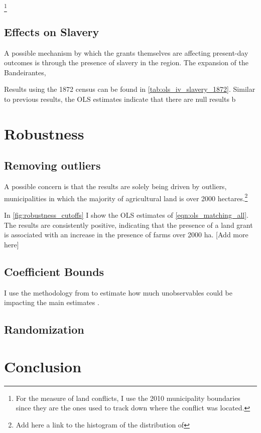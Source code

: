 \documentclass{article}
\begin{document}
\parencite{Albertus2018-bf}

\footnote{For the measure of land conflicts, I use the 2010 municipality boundaries since they are the ones used to track down where the conflict was located.}

\subsection{Effects on Slavery}

A possible mechanism by which the grants themselves are affecting present-day outcomes is through the presence of slavery in the region. 
The expansion of the Bandeirantes, 

Results using the 1872 census can be found in \autoref{tab:ols_iv_slavery_1872}.
Similar to previous results, the OLS estimates indicate that there are null results b

\section{Robustness}
\subsection{Removing outliers}

A possible concern is that the results are solely being driven by outliers, municipalities in which the majority of agricultural land is over 2000 hectares.\footnote{Add here a link to the histogram of the distribution of }

In \autoref{fig:robustness_cutoffs} I show the OLS estimates of \autoref{eqn:ols_matching_all}. 
The results are consistently positive, indicating that the presence of a land grant is associated with an increase in the presence of farms over 2000 ha. 
[Add more here]

\subsection{Coefficient Bounds}

I use the methodology from to estimate how much unobservables could be impacting the main estimates \textcite{Masten2022-bg}.

\subsection{Randomization}

\section{Conclusion}
\end{document}
